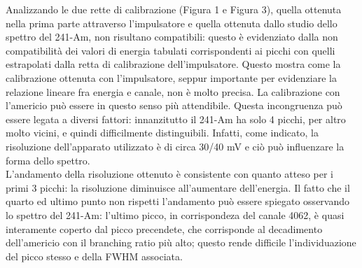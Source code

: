 \documentclass[a4paper,10pt]{article}
\begin{document}
\noindent Analizzando le due rette di calibrazione (Figura 1 e Figura 3), quella ottenuta nella prima parte attraverso l'impulsatore e quella ottenuta dallo studio dello spettro del 241-Am, non risultano compatibili: questo \`e evidenziato dalla non compatibilit\`a dei valori di energia tabulati corrispondenti ai picchi con quelli estrapolati dalla retta di calibrazione dell'impulsatore. Questo mostra come la calibrazione ottenuta con l'impulsatore, seppur importante per evidenziare la relazione lineare fra energia e canale, non \`e molto precisa. La calibrazione con l'americio pu\`o essere in questo senso pi\`u attendibile. Questa incongruenza pu\`o essere legata a diversi fattori: innanzitutto il 241-Am ha solo 4 picchi, per altro molto vicini, e quindi difficilmente distinguibili. Infatti, come indicato, la risoluzione dell'apparato utilizzato \`e di circa 30/40 mV e ci\`o pu\`o influenzare la forma dello spettro.\\
L'andamento della risoluzione ottenuto \`e consistente con quanto atteso per i primi 3 picchi: la risoluzione diminuisce all'aumentare dell'energia. Il fatto che il quarto ed ultimo punto non rispetti l'andamento pu\`o essere spiegato osservando lo spettro del 241-Am: l'ultimo picco, in corrispondeza del canale 4062, \`e quasi interamente coperto dal picco precendete, che corrisponde al decadimento dell'americio con il branching ratio pi\`u alto; questo rende difficile l'individuazione del picco stesso e della FWHM associata. 
\end{document}
